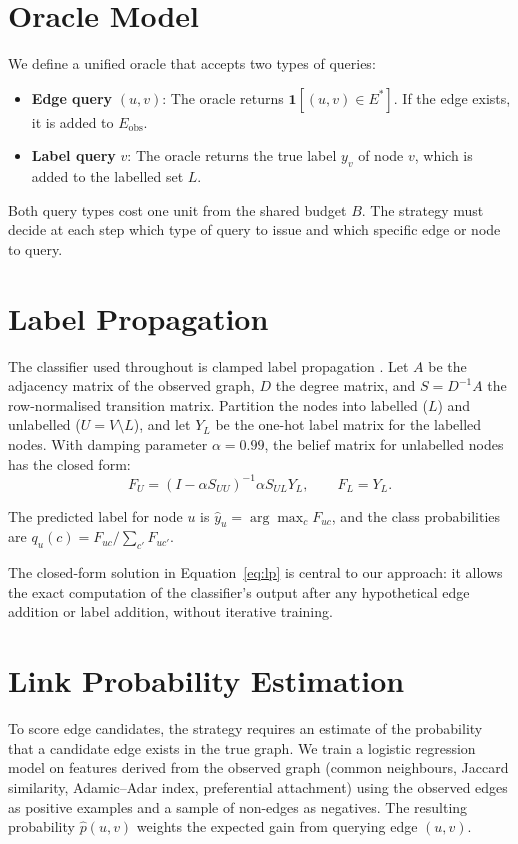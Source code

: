 \documentclass[12pt,a4paper,oneside]{report}
\begin{document}
\section{Oracle Model}

We define a unified oracle that accepts two types of queries:
\begin{itemize}[leftmargin=2em]
    \item \textbf{Edge query} $(u, v)$: The oracle returns $\mathbf{1}[(u,v) \in E^*]$. If the edge exists, it is added to $E_{\text{obs}}$.
    \item \textbf{Label query} $v$: The oracle returns the true label $y_v$ of node $v$, which is added to the labelled set $L$.
\end{itemize}
Both query types cost one unit from the shared budget $B$. The strategy must decide at each step which type of query to issue and which specific edge or node to query.

\section{Label Propagation}

The classifier used throughout is clamped label propagation \citep{zhu}. Let $A$ be the adjacency matrix of the observed graph, $D$ the degree matrix, and $S = D^{-1}A$ the row-normalised transition matrix. Partition the nodes into labelled ($L$) and unlabelled ($U = V \setminus L$), and let $Y_L$ be the one-hot label matrix for the labelled nodes. With damping parameter $\alpha = 0.99$, the belief matrix for unlabelled nodes has the closed form:
\begin{equation}
\label{eq:lp}
    F_U = (I - \alpha S_{UU})^{-1} \alpha S_{UL} Y_L, \qquad F_L = Y_L.
\end{equation}

The predicted label for node $u$ is $\hat{y}_u = \arg\max_c F_{uc}$, and the class probabilities are $q_u(c) = F_{uc} / \sum_{c'} F_{uc'}$.

The closed-form solution in Equation~\eqref{eq:lp} is central to our approach: it allows the exact computation of the classifier's output after any hypothetical edge addition or label addition, without iterative training.

\section{Link Probability Estimation}

To score edge candidates, the strategy requires an estimate of the probability that a candidate edge exists in the true graph. We train a logistic regression model on features derived from the observed graph (common neighbours, Jaccard similarity, Adamic--Adar index, preferential attachment) using the observed edges as positive examples and a sample of non-edges as negatives. The resulting probability $\hat{p}(u,v)$ weights the expected gain from querying edge $(u,v)$.
\end{document}
